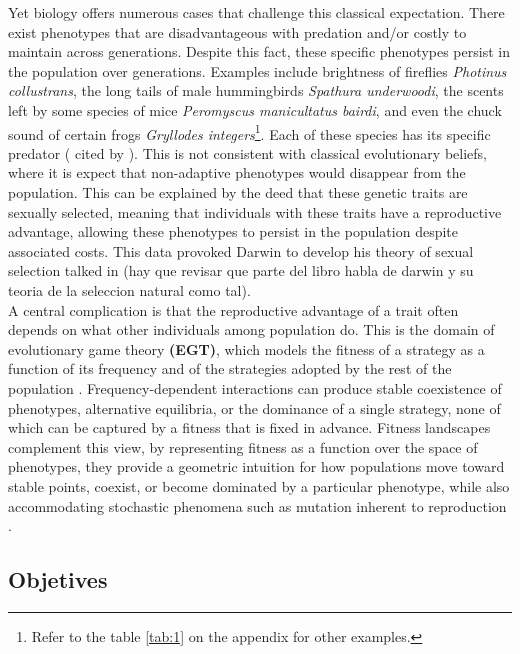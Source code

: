 Yet biology offers numerous cases that challenge this classical expectation. There exist phenotypes that are disadvantageous with predation and/or costly to maintain across generations. Despite this fact, these specific phenotypes persist in the population over generations. Examples include brightness of fireflies \textit{Photinus collustrans}, the long tails of male hummingbirds \textit{Spathura underwoodi}, the scents left by some species of mice \textit{Peromyscus manicultatus bairdi}, and even the chuck sound of certain frogs \textit{Gryllodes integers}\footnote{Refer to the table \ref{tab:1} on the appendix for other examples.}. Each of these species has its specific predator  (\cite{ryan1985,  cushing1985estrous} cited by \cite{magnhagen1991}). This is not consistent with classical evolutionary beliefs, where it is expect that non-adaptive phenotypes would disappear from the population. This can be explained by the deed that these genetic traits are sexually selected, meaning that individuals with these traits have a reproductive advantage, allowing these phenotypes to persist in the population despite associated costs. This data provoked Darwin to develop his theory of sexual selection talked in \cite{andersson1994} (hay que revisar que parte del libro habla de darwin y su teoria de la seleccion natural como tal). \\

A central complication is that the reproductive advantage of a trait often depends on what other individuals among population do. This is the domain of evolutionary game theory \textbf{(EGT)}, which models the fitness of a strategy as a function of its frequency and of the strategies adopted by the rest of the population \cite{nowakEvolutionaryDynamicsExploring2006}. Frequency-dependent interactions can produce stable coexistence of phenotypes, alternative equilibria, or the dominance of a single strategy, none of which can be captured by a fitness that is fixed in advance. Fitness landscapes complement this view, by representing fitness as a function over the space of phenotypes, they provide a geometric intuition for how populations move toward stable points, coexist, or become dominated by a particular phenotype, while also accommodating stochastic phenomena such as mutation inherent to reproduction \cite{bartonApplicationStatisticalPhysics2009}.\\


\subsection{Objetives}
